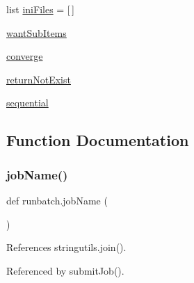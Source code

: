 \begin{DoxyCompactItemize}
\item 
list \mbox{\hyperlink{namespacerunbatch_a406d19b2a1a22d99a9ba40e9ffedc9d4}{ini\+Files}} = \mbox{[}$\,$\mbox{]}
\item 
\mbox{\hyperlink{namespacerunbatch_a8af68072210cefbaa39e117194d52ca9}{want\+Sub\+Items}}
\item 
\mbox{\hyperlink{namespacerunbatch_aeab8b48441a9c2620e08cdc04e58dcbf}{converge}}
\item 
\mbox{\hyperlink{namespacerunbatch_a45e83936512fc96e82e8fcfd0a1c2934}{return\+Not\+Exist}}
\item 
\mbox{\hyperlink{namespacerunbatch_ad037db0f7bc1970c377cfdc559871835}{sequential}}
\end{DoxyCompactItemize}


\subsection{Function Documentation}
\mbox{\label{namespacerunbatch_af5b0020e591d211b50a7a8254783847a}} 
\subsubsection{\texorpdfstring{job\+Name()}{jobName()}}
{\footnotesize\ttfamily def runbatch.\+job\+Name (\begin{DoxyParamCaption}{ }\end{DoxyParamCaption})}



References stringutils.\+join().



Referenced by submit\+Job().

